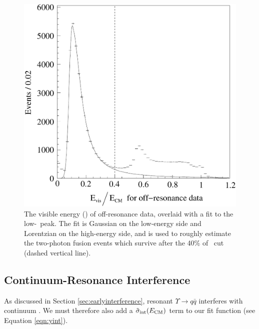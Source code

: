 \documentclass{cornell}
\begin{document}
\begin{figure}[p]
  \begin{center}
    \includegraphics[width=\linewidth]{plots/extrapolatevisen}
  \end{center}
  \caption[Extrapolation of two-photon peak into the accepted visible
  energy region]{\label{extrapolatevisen} The visible energy (\visen)
  of off-resonance data, overlaid with a fit to the low-\visen\ peak.
  The fit is Gaussian on the low-energy side and Lorentzian on the
  high-energy side, and is used to roughly estimate the two-photon
  fusion events which survive after the 40\% of \ecm\ cut (dashed
  vertical line).}

\end{figure}

\subsection{Continuum-Resonance Interference}

As discussed in Section \ref{sec:earlyinterference}, resonant
$\Upsilon \to q\bar{q}$ interferes with continuum \qqbar.  We must
therefore also add a $\tilde{\sigma}_{\mbox{\scriptsize int}}(E_{\mbox{\scriptsize CM}})$ term to
our fit function (see Equation \ref{eqn:yint}).
\end{document}
